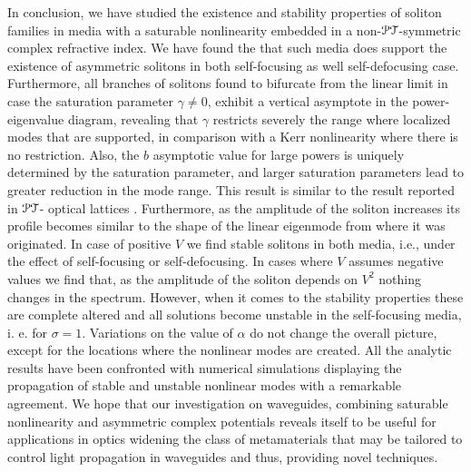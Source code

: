 \documentclass[aps,pre,showpacs,twocolumn]{revtex4}
\newcommand{\PT}{{\cal PT}}
\begin{document}
In conclusion, we have studied the existence and stability properties of soliton  families in media with a saturable nonlinearity embedded in a non-$\PT$-symmetric complex refractive index. We 
have found the that such media does support the existence of asymmetric solitons in both self-focusing as well self-defocusing case. Furthermore, 
all branches of solitons found to bifurcate from the linear limit in case the saturation parameter $\gamma \neq 0$, exhibit a vertical asymptote in the power-eigenvalue diagram, revealing that $\gamma$ restricts severely
the range where localized modes that are supported, in comparison 
with a Kerr nonlinearity where there is no restriction. Also, the $b$ asymptotic value for large powers is uniquely determined by the saturation 
parameter, and larger saturation parameters lead to greater reduction in 
the mode range. This result is similar to the result reported in ${\cal PT}$- optical lattices \cite{Hu-Hu}. Furthermore, as the amplitude of the soliton increases its profile becomes similar to the shape of the linear eigenmode from where it was originated. In case of positive $V$ we find stable solitons in both media, i.e.,  under the effect of self-focusing or self-defocusing. In cases where $V$ assumes negative values we find that, as the amplitude of the soliton depends on $V^2$ nothing changes in the spectrum. However, when it comes to the stability properties these are complete altered and all solutions become unstable in the 
self-focusing media, i. e. for $\sigma = 1$. Variations on the value of $\alpha$ do not change the overall  picture, except for the locations where the nonlinear modes are created. All the analytic results have been 
confronted with numerical simulations displaying the propagation of 
stable and unstable nonlinear modes with a remarkable agreement. 
We hope that our investigation on waveguides, combining saturable nonlinearity and asymmetric complex potentials reveals itself to be 
useful for applications
in optics widening the class of metamaterials that may be tailored
to control light propagation in waveguides and thus, providing novel techniques. 
\end{document}
